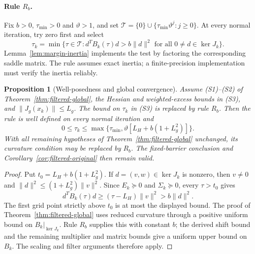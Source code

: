 \documentclass[pdflatex,sn-mathphys-num]{sn-jnl}
\theoremstyle{thmstyleone}
\newtheorem{proposition}[theorem]{Proposition}
\theoremstyle{thmstylethree}
\begin{document}
\paragraph{Rule $R_b$.}
Fix $b>0$, $\tau_{\min}>0$ and $\vartheta>1$, and set
$\mathcal T=\{0\}\cup\{\tau_{\min}\vartheta^j:j\geq0\}$.
At every normal iteration, try zero first and select
\[
 \tau_k=\min\{\tau\in\mathcal T:
     d^TB_k(\tau)d>b\|d\|^2\text{ for all }0\ne d\in\ker J_k\}.
\]
Lemma~\ref{lem:margin-inertia} implements the test by factoring the
corresponding saddle matrix. The rule assumes exact inertia; a
finite-precision implementation must verify the inertia reliably.

\begin{proposition}[Well-posedness and global convergence]
\label{prop:Rb-global}
Assume (S1)--(S2) of
Theorem~\ref{thm:filtered-global}, the Hessian and weighted-excess bounds
in (S3), and $\|J_g(x_k)\|\leq L_g$.
The bound on $\tau_k$ in (S3) is replaced by rule $R_b$.
Then the rule is well defined on every normal iteration and
\[
 0\leq\tau_k\leq
 \max\{\tau_{\min},\vartheta[L_H+b(1+L_g^2)]\}.
\]
With all remaining hypotheses of Theorem~\ref{thm:filtered-global}
unchanged, its curvature condition may be replaced by $R_b$.
The fixed-barrier conclusion and Corollary~\ref{cor:filtered-original}
then remain valid.
\end{proposition}
\begin{proof}
Put $t_0=L_H+b(1+L_g^2)$. If $d=(v,w)\in\ker J_k$ is nonzero,
then $v\ne0$ and $\|d\|^2\leq(1+L_g^2)\|v\|^2$.
Since $E_k\succeq0$ and $\Sigma_k\succeq0$, every $\tau>t_0$ gives
\[
 d^TB_k(\tau)d\geq(\tau-L_H)\|v\|^2>b\|d\|^2.
\]
The first grid point strictly above $t_0$ is at most the displayed
bound. The proof of Theorem~\ref{thm:filtered-global} uses reduced
curvature through a positive uniform bound on $B_k|_{\ker J_k}$.
Rule $R_b$ supplies this with constant $b$; the derived shift bound
and the remaining multiplier and matrix bounds give a uniform upper
bound on $B_k$. The scaling and filter arguments therefore apply.
\end{proof}
\end{document}
